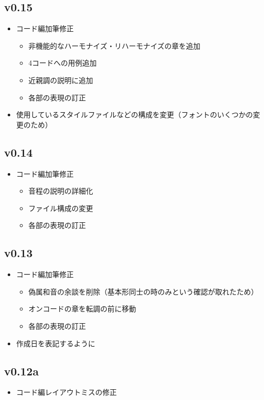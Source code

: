 \documentclass[dvipdfmx,uplatex,b5paper,openany,jbase=12Q,nomag*,textwidth-limit=44%
               ]{gachimuchi}
\begin{document}
\subsection{v0.15}
\begin{itemize}
  \item コード編加筆修正
  \begin{itemize}
    \item 非機能的なハーモナイズ・リハーモナイズの章を追加
    \item \Sus4コードへの用例追加
    \item 近親調の説明に追加
    \item 各部の表現の訂正
  \end{itemize}
  \item 使用しているスタイルファイルなどの構成を変更（フォントのいくつかの変更のため）
\end{itemize}
\subsection{v0.14}
\begin{itemize}
  \item コード編加筆修正
  \begin{itemize}
    \item 音程の説明の詳細化
    \item ファイル構成の変更
    \item 各部の表現の訂正
  \end{itemize}
\end{itemize}
\subsection{v0.13}
\begin{itemize}
  \item コード編加筆修正
  \begin{itemize}
    \item 偽属和音の余談を削除（基本形同士の時のみという確認が取れたため）
    \item オンコードの章を転調の前に移動
    \item 各部の表現の訂正
  \end{itemize}
  \item 作成日を表記するように
\end{itemize}
\subsection{v0.12a}
\begin{itemize}
  \item コード編レイアウトミスの修正
\end{itemize}
\end{document}
